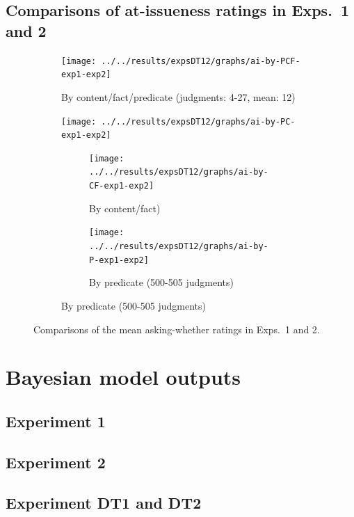 \documentclass[11pt,fleqn]{article}
\newcommand{\6}{\mbox{$[\hspace*{-.6mm}[$}}
\newcommand{\9}{\mbox{$]\hspace*{-.6mm}]$}}
\begin{document}
\newpage

\subsection{Comparisons of at-issueness ratings in Exps.~1 and 2}\label{a-beliefs-corr-ai}

\begin{figure}[h!]
\centering
\begin{subfigure}[t]{.45\textwidth}
\centering
\texttt{[image: ../../results/expsDT12/graphs/ai-by-PCF-exp1-exp2]}
\caption{By content/fact/predicate (judgments: 4-27, mean: 12)}
\end{subfigure} \hfill \begin{subfigure}[t]{.45\textwidth}
\centering
\texttt{[image: ../../results/expsDT12/graphs/ai-by-PC-exp1-exp2]}
\caption{By content/predicate (judgments: 14-43, mean: 25)}

\begin{subfigure}[t]{.4\textwidth}
\centering
\texttt{[image: ../../results/expsDT12/graphs/ai-by-CF-exp1-exp2]}
\caption{By content/fact)}
 \end{subfigure} \hfill \begin{subfigure}[t]{.4\textwidth}
\centering
\texttt{[image: ../../results/expsDT12/graphs/ai-by-P-exp1-exp2]}
\caption{By predicate (500-505 judgments)}
 \end{subfigure}
 \end{subfigure}
 
\caption{Comparisons of the mean asking-whether ratings in Exps.~1 and 2.}\label{fig:ai-comparisons}
\end{figure}

\section{Bayesian model outputs}\label{a-models}

\subsection{Experiment 1}\label{a-models-exp1}



\subsection{Experiment 2}\label{a-models-exp2}



\subsection{Experiment DT1 and DT2}\label{a-models-OM}


\end{document}
